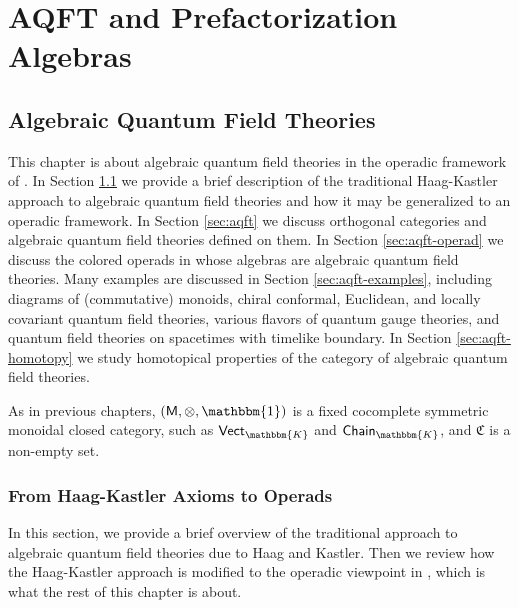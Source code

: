 \documentclass{amsbook}
\numberwithin{section}{chapter}
\numberwithin{subsection}{section}
\numberwithin{equation}{section}
\theoremstyle{plain}
\theoremstyle{definition}
\newcommand{\fieldk}{\mathbbm{K}}
\newcommand{\colorc}{\mathfrak{C}}
\newcommand{\M}{\mathsf{M}}
\newcommand{\tensorunit}{\mathbbm{1}}
\newcommand{\Chaink}{\mathsf{Chain}_{\fieldk}}
\newcommand{\Vectk}{\mathsf{Vect}_{\fieldk}}
\begin{document}
\part{AQFT and Prefactorization Algebras}\label{part:aqft-pfa}

\chapter{Algebraic Quantum Field Theories}\label{ch:aqft}

This chapter is about algebraic quantum field theories in the operadic framework of \cite{bsw}.  In Section \ref{sec:haag-kastler} we provide a brief description of the traditional Haag-Kastler approach to algebraic quantum field theories and how it may be generalized to an operadic framework.  In Section \ref{sec:aqft} we discuss orthogonal categories and algebraic quantum field theories defined on them.  In Section \ref{sec:aqft-operad} we discuss the colored operads in \cite{bsw} whose algebras are algebraic quantum field theories.  Many examples are discussed in Section \ref{sec:aqft-examples}, including diagrams of (commutative) monoids, chiral conformal, Euclidean, and locally covariant quantum field theories, various flavors of quantum gauge theories, and quantum field theories on spacetimes with timelike boundary.  In Section \ref{sec:aqft-homotopy} we study homotopical properties of the category of algebraic quantum field theories.

As in previous chapters, $(\M,\otimes,\tensorunit)$ is a fixed cocomplete symmetric monoidal closed category, such as $\Vectk$ and $\Chaink$, and $\colorc$ is a non-empty set.


\section{From Haag-Kastler Axioms to Operads}\label{sec:haag-kastler}

In this section, we provide a brief overview of the traditional approach to algebraic quantum field theories due to Haag and Kastler.  Then we review how the Haag-Kastler approach is modified to the operadic viewpoint in \cite{bsw}, which is what the rest of this chapter is about.
\end{document}
